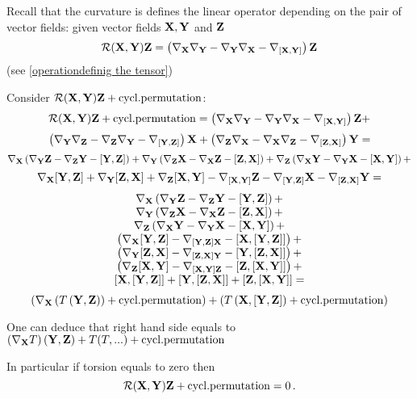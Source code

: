 \documentclass[12pt]{article}
\theoremstyle{theorem}
\numberwithin{equation}{section}
\begin{document}
Recall that the curvature is defines the linear operator depending
on the pair of vector fields: given vector fields ${\bf X},{\bf Y}$ and ${\bf Z}$
\begin{equation}\label{operationdefinig the tensor1A}
   {\cal R}({\bf X},{\bf Y}){\bf Z}=
    \left(
    \nabla_{\bf X}\nabla_{\bf Y}-\nabla_{\bf Y}\nabla_{\bf X}-
   \nabla_{[{\bf X},{\bf Y}]}
    \right){\bf Z}
\end{equation}
(see \eqref{operationdefinig the tensor})


   Consider
    ${\cal R}({\bf X},{\bf Y}){\bf Z}+{\rm cycl.permutation}$:
    \begin{equation}\label{biancifirst}
{\cal R}({\bf X},{\bf Y}){\bf Z}+{\rm
cycl.permutation}=\left(\nabla_{\bf X}\nabla_{\bf Y}-\nabla_{\bf Y}\nabla_{\bf X}-
   \nabla_{[{\bf X},{\bf Y}]}\right){\bf Z}+
\end{equation}
     $$
\left(\nabla_{\bf Y}\nabla_{\bf Z}-\nabla_{\bf Z}\nabla_{\bf Y}-
   \nabla_{[{\bf Y},{\bf Z}]}\right){\bf X}+\left(\nabla_{\bf Z}\nabla_{\bf X}-\nabla_{\bf X}\nabla_{\bf Z}-
   \nabla_{[{\bf Z},{\bf X}]}\right){\bf Y}=
     $$
     $$
     \nabla_{\bf X}\left(\nabla_{\bf Y} {\bf Z}-\nabla_{\bf Z} {\bf Y}-[{\bf Y},{\bf Z}]\right)+
      \nabla_{\bf Y}\left(\nabla_{\bf Z}{\bf X}-\nabla_{\bf X} {\bf Z}-[{\bf Z},{\bf X}]\right)+
       \nabla_{\bf Z}\left(\nabla_{\bf X} {\bf Y}-\nabla_{\bf Y} {\bf X}-[{\bf X},{\bf Y}]\right)+
        $$
        $$
       \nabla_{\bf X}[{\bf Y},{\bf Z}]+\nabla_{\bf Y}[{\bf Z},{\bf X}]+\nabla_{\bf Z}[{\bf X},{\bf Y}]-
       \nabla_{[{\bf X},{\bf Y}]}{\bf Z}-\nabla_{[{\bf Y},{\bf Z}]}{\bf X}-\nabla_{[{\bf Z},{\bf X}]}{\bf Y}=
          $$
       $$
        \begin{matrix}
        \nabla_{\bf X}\left(\nabla_{\bf Y} {\bf Z}-\nabla_{\bf Z} {\bf Y}-[{\bf Y},{\bf Z}]\right)+\cr
      \nabla_{\bf Y}\left(\nabla_{\bf Z}{\bf X}-\nabla_{\bf X} {\bf Z}-[{\bf Z},{\bf X}]\right)+\cr
       \nabla_{\bf Z}\left(\nabla_{\bf X} {\bf Y}-\nabla_{\bf Y} {\bf X}-[{\bf X},{\bf Y}]\right)+\cr
\left(\nabla_{\bf X}[{\bf Y},{\bf Z}]-\nabla_{[{\bf Y},{\bf Z}]{\bf X}}-\left[{\bf X},\left[{\bf Y},{\bf Z}\right]\right]\right)+\cr
\left(\nabla_{\bf Y}[{\bf Z},{\bf X}]-\nabla_{[{\bf Z},{\bf X}]{\bf Y}}-\left[{\bf Y},\left[{\bf Z},{\bf X}\right]\right]\right)+\cr
\left(\nabla_{\bf Z}[{\bf X},{\bf Y}]-\nabla_{[{\bf X},{\bf Y}]{\bf Z}}-\left[{\bf Z},\left[{\bf X},{\bf Y}\right]\right]\right)+\cr
\left[{\bf X},\left[{\bf Y},{\bf Z}\right]\right]+\left[{\bf Y},\left[{\bf Z},{\bf X}\right]\right]+\left[{\bf Z},\left[{\bf X},{\bf Y}\right]\right]=\cr
\end{matrix}
       $$
\begin{equation}\label{torsioncyclicpermutation}
    \left(\nabla_{\bf X}\left(T\left({\bf Y},{\bf Z}\right)\right)+{\rm cycl.permutation}\right)+
    \left(T\left({\bf X},[{\bf Y},{\bf Z}]\right)+{\rm cycl.permutation}\right)
\end{equation}

One can deduce that right hand side equals to $\left(\nabla_{\bf X}
T\right)({\bf Y},{\bf Z})+T(T,...)+{\rm cycl.permutation}$

In particular if torsion equals to zero then
     $$
     {\cal R}({\bf X},{\bf Y}){\bf Z}+{\rm cycl.permutation}=0\,.
     $$


 
\end{document}
